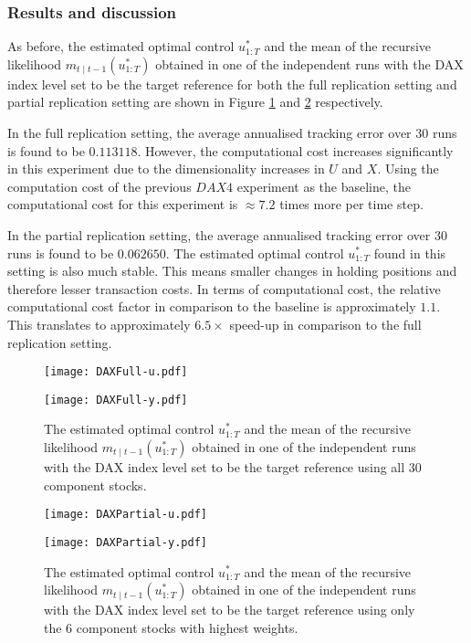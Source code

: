 \subsubsection{Results and discussion}
As before, the estimated optimal control $u^*_{1:T}$ and the mean of the recursive likelihood $m_{t \mid t-1}(u^*_{1:T})$ obtained in one of the independent runs with the DAX index level set to be the target reference for both the full replication setting and partial replication setting are shown in Figure \ref{fig:dax} and \ref{fig:daxpartial} respectively.

In the full replication setting, the average annualised tracking error over $30$ runs is found to be $0.113118$. However, the computational cost increases significantly in this experiment due to the dimensionality increases in $U$ and $X$. Using the computation cost of the previous $DAX4$ experiment as the baseline, the computational cost for this experiment is $\approx 7.2$ times more per time step.

In the partial replication setting, the average annualised tracking error over $30$ runs is found to be $0.062650$. The estimated optimal control $u^*_{1:T}$ found in this setting is also much stable. This means smaller changes in holding positions and therefore lesser transaction costs. In terms of computational cost, the relative computational cost factor in comparison to the baseline is approximately $1.1$. This translates to approximately $6.5\times$ speed-up in comparison to the full replication setting.

\begin{figure}[htbp]
\centering
    \begin{minipage}{0.5\textwidth}
        \centering
        \texttt{[image: DAXFull-u.pdf]}
    \end{minipage}%
    \begin{minipage}{0.5\textwidth}
        \centering
        \texttt{[image: DAXFull-y.pdf]}
    \end{minipage}
\caption{The estimated optimal control $u^*_{1:T}$ and the mean of the recursive likelihood $m_{t \mid t-1}(u^*_{1:T})$ obtained in one of the independent runs with the DAX index level set to be the target reference using all $30$ component stocks.}
\label{fig:dax}
\end{figure}

\begin{figure}[htbp]
\centering
    \begin{minipage}{0.5\textwidth}
        \centering
        \texttt{[image: DAXPartial-u.pdf]}
    \end{minipage}%
    \begin{minipage}{0.5\textwidth}
        \centering
        \texttt{[image: DAXPartial-y.pdf]}
    \end{minipage}
\caption{The estimated optimal control $u^*_{1:T}$ and the mean of the recursive likelihood $m_{t \mid t-1}(u^*_{1:T})$ obtained in one of the independent runs with the DAX index level set to be the target reference using only the $6$ component stocks with highest weights.}
\label{fig:daxpartial}
\end{figure}

